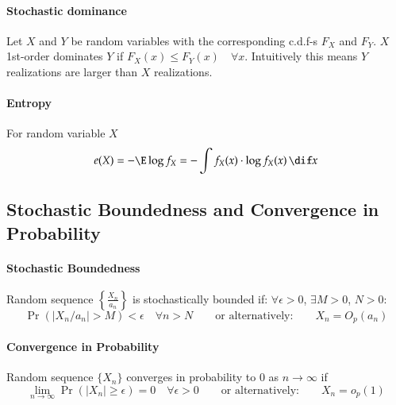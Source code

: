 \documentclass[a4paper]{article}
\numberwithin{equation}{subsection}
\begin{document}
\paragraph{Stochastic dominance}

Let $X$ and $Y$ be random variables with the corresponding c.d.f-s
$F_{X}$ and $F_{Y}$.  $X$ 1st-order dominates $Y$ if $F_{X}(x) \le
F_{Y}(x) \quad \forall x$.  Intuitively this means $Y$ realizations
are larger than $X$ realizations.


\paragraph{Entropy}

For random variable $X$
\begin{equation}
  e(X) = -\E \log f_{X} = -\int f_{X}(x) \cdot \log f_{X}(x) \,\dif x
\end{equation}

\subsection{Stochastic Boundedness and Convergence in Probability}
\label{sec:stochastic_boundedness}

\paragraph{Stochastic Boundedness}

Random sequence 
\begin{math}
\left\{\frac{X_{n}}{a_{n}} \right\}  
\end{math}
 is stochastically bounded if:
$\forall \epsilon >0$, $\exists M > 0$, $N>0$:
\begin{equation}
  \label{eq:stochastic_boundedness}
  \Pr( | X_{n}/a_{n}| > M) < \epsilon
  \quad \forall n > N
  \qquad
  \text{or alternatively:}
  \qquad
  X_{n} = O_{p}(a_{n})
\end{equation}


\paragraph{Convergence in Probability}

Random sequence $\{X_{n}\}$ converges in probability to 0 as $n\to\infty$
if
\begin{equation}
  \label{eq:convergence_in_probability}
  \lim_{n\to\infty} \Pr( | X_{n}| \ge \epsilon) = 0
  \quad \forall \epsilon > 0
  \qquad
  \text{or alternatively:}
  \qquad
  X_{n} = o_{p}(1)
\end{equation}
\end{document}
